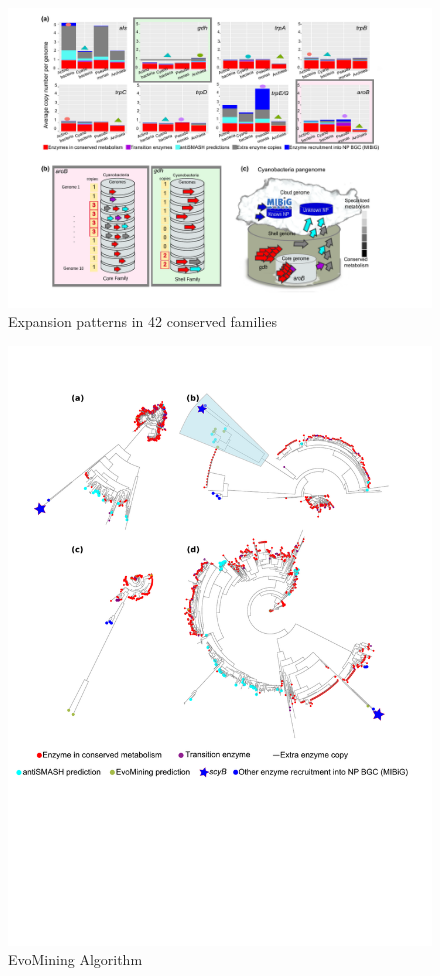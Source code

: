 \documentclass[12pt,twoside]{reedthesis}
\begin{document}
  \begin{figure}[h!tbp]
  \centering
  \includegraphics[angle = 0,scale = 1]{chapter2/FigurasPaper/Figure3.pdf}
  \caption[Expansion patterns in 42 conserved families]{\normalsize{Expansion patterns in 42 conserved families}}
  \label{fig:Expansion patterns in 42 conserved families}
  \end{figure}
  
  \begin{figure}[h!tbp]
  \centering
  \includegraphics[angle = 0,scale = 1]{chapter2/FigurasPaper/Figure4.pdf}
  \caption[EvoMining Algorithm]{\normalsize{EvoMining Algorithm}}
  \label{fig:EvoMining Algorithms}
  \end{figure}
  
\end{document}
